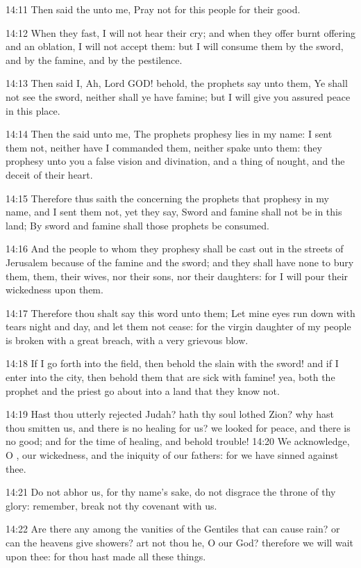 14:11 Then said the \LORD unto me, Pray not for this people for their good.

14:12 When they fast, I will not hear their cry; and when they offer burnt offering and an oblation, I will not accept them: but I will consume them by the sword, and by the famine, and by the pestilence.

14:13 Then said I, Ah, Lord GOD! behold, the prophets say unto them, Ye shall not see the sword, neither shall ye have famine; but I will give you assured peace in this place.

14:14 Then the \LORD said unto me, The prophets prophesy lies in my name: I sent them not, neither have I commanded them, neither spake unto them: they prophesy unto you a false vision and divination, and a thing of nought, and the deceit of their heart.

14:15 Therefore thus saith the \LORD concerning the prophets that prophesy in my name, and I sent them not, yet they say, Sword and famine shall not be in this land; By sword and famine shall those prophets be consumed.

14:16 And the people to whom they prophesy shall be cast out in the streets of Jerusalem because of the famine and the sword; and they shall have none to bury them, them, their wives, nor their sons, nor their daughters: for I will pour their wickedness upon them.

14:17 Therefore thou shalt say this word unto them; Let mine eyes run down with tears night and day, and let them not cease: for the virgin daughter of my people is broken with a great breach, with a very grievous blow.

14:18 If I go forth into the field, then behold the slain with the sword!  and if I enter into the city, then behold them that are sick with famine!  yea, both the prophet and the priest go about into a land that they know not.

14:19 Hast thou utterly rejected Judah? hath thy soul lothed Zion? why hast thou smitten us, and there is no healing for us? we looked for peace, and there is no good; and for the time of healing, and behold trouble!  14:20 We acknowledge, O \LORD, our wickedness, and the iniquity of our fathers: for we have sinned against thee.

14:21 Do not abhor us, for thy name's sake, do not disgrace the throne of thy glory: remember, break not thy covenant with us.

14:22 Are there any among the vanities of the Gentiles that can cause rain? or can the heavens give showers? art not thou he, O \LORD our God?  therefore we will wait upon thee: for thou hast made all these things.


